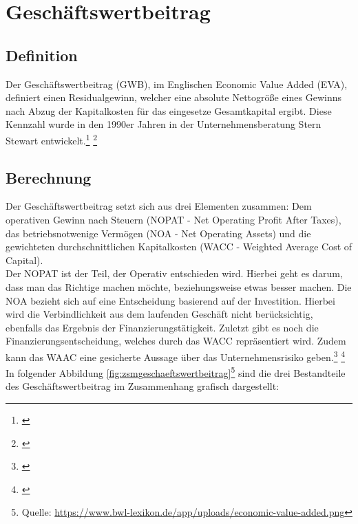\chapter{Geschäftswertbeitrag}
\label{Geschaeftswertbeitrag}

\section{Definition}
Der Geschäftswertbeitrag (GWB), im Englischen Economic Value Added (EVA), definiert einen Residualgewinn, welcher eine absolute Nettogröße eines Gewinns nach Abzug der Kapitalkosten für das eingesetze Gesamtkapital ergibt. Diese Kennzahl wurde in den 1990er Jahren in der Unternehmensberatung Stern Stewart entwickelt.\footnote{\cite{wikipedia-eva}} \footnote{\cite{controlling-eva}}

\section{Berechnung}

Der Geschäftswertbeitrag setzt sich aus drei Elementen zusammen: Dem operativen Gewinn nach Steuern (NOPAT - Net Operating Profit After Taxes), das betriebsnotwenige Vermögen (NOA - Net Operating Assets) und die gewichteten durchschnittlichen Kapitalkosten (WACC - Weighted Average Cost of Capital).\\
Der NOPAT ist der Teil, der Operativ entschieden wird. Hierbei geht es darum, dass man das Richtige machen möchte, beziehungsweise etwas besser machen. Die NOA bezieht sich auf eine Entscheidung basierend auf der Investition. Hierbei wird die Verbindlichkeit aus dem laufenden Geschäft nicht berücksichtig, ebenfalls das Ergebnis der Finanzierungstätigkeit. Zuletzt gibt es noch die Finanzierungsentscheidung, welches durch das WACC repräsentiert wird. Zudem kann das WAAC eine gesicherte Aussage über das Unternehmensrisiko geben.\footnote{\cite{bwllexicon-eva}} \footnote{\cite{wikipedia-eva}}\\
In folgender Abbildung \ref{fig:zsmgeschaeftswertbeitrag}\footnote{Quelle: \url{https://www.bwl-lexikon.de/app/uploads/economic-value-added.png}} sind die drei Bestandteile des Geschäftswertbeitrag im Zusammenhang grafisch dargestellt:

